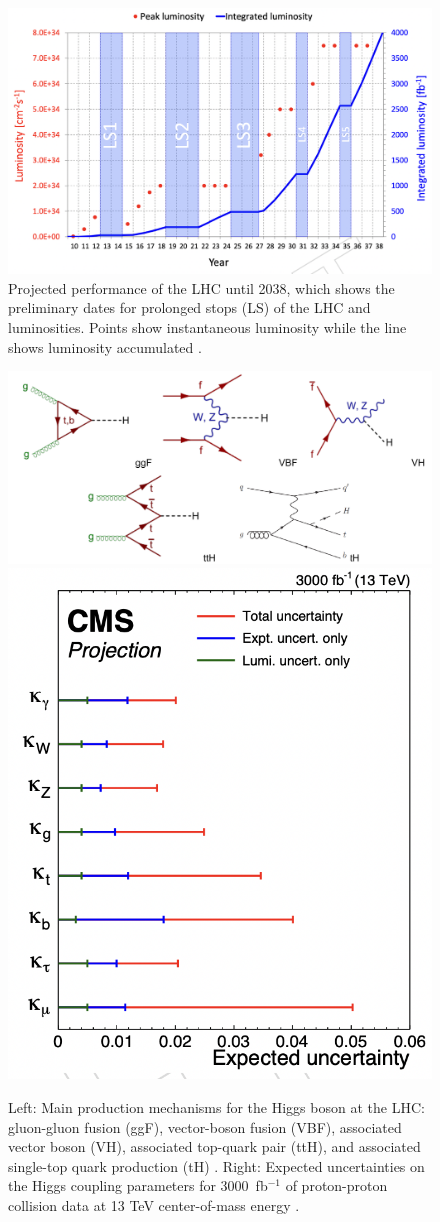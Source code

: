 \documentclass[final,12p]{article}
\newcommand{\lumi}[1]{{#1~fb$^{-1}$}}
\begin{document}
\begin{figure}[H]
  \centering
  \includegraphics[width=0.8\columnwidth]{./HLLHCLumi.png}
  \caption{
    Projected performance of the LHC until 2038, which shows the preliminary dates for prolonged stops (LS) of the LHC and luminosities. Points show instantaneous luminosity while the line shows luminosity accumulated \cite{collaborations2019report}.
  }
  \label{figure6}
\end{figure}


 \begin{figure}[H]
   \centering
   \includegraphics[width=0.7\columnwidth]{./pg.png}
   \includegraphics[width=0.29\columnwidth]{./higgs_couplings.png}
   \caption{
     Left: Main production mechanisms for the Higgs boson at the LHC: gluon-gluon fusion (ggF), vector-boson fusion (VBF), associated vector boson (VH), associated top-quark pair (ttH), and  associated single-top quark production (tH)  \cite{Grojean:2017hsb}  \cite{Khachatryan:2015ota} .
     Right: Expected uncertainties on the Higgs coupling parameters for  \lumi{3000} of proton-proton collision data at 13 TeV center-of-mass energy \cite{Cepeda:2019klc}.
   }
   \label{figureKappasUncs}
 \end{figure}
\end{document}
